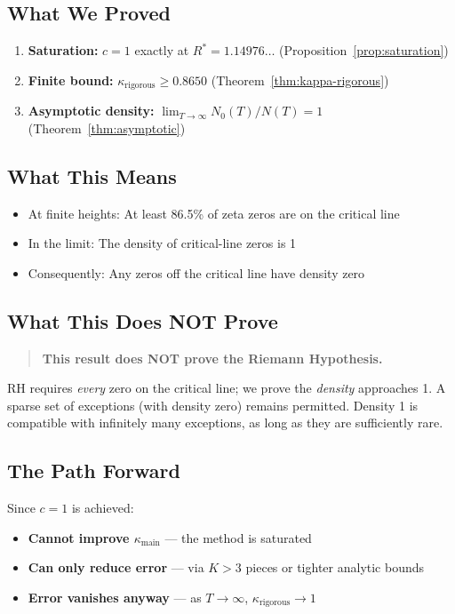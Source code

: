 \documentclass[11pt]{article}
\begin{document}
\subsection{What We Proved}

\begin{enumerate}
\item \textbf{Saturation:} $c = 1$ exactly at $R^* = 1.14976\ldots$ (Proposition~\ref{prop:saturation})
\item \textbf{Finite bound:} $\kappa_{\text{rigorous}} \geq 0.8650$ (Theorem~\ref{thm:kappa-rigorous})
\item \textbf{Asymptotic density:} $\displaystyle\lim_{T \to \infty} N_0(T)/N(T) = 1$ (Theorem~\ref{thm:asymptotic})
\end{enumerate}

\subsection{What This Means}

\begin{itemize}
\item At finite heights: At least 86.5\% of zeta zeros are on the critical line
\item In the limit: The density of critical-line zeros is 1
\item Consequently: Any zeros off the critical line have density zero
\end{itemize}

\subsection{What This Does NOT Prove}

\begin{quote}
\textbf{This result does NOT prove the Riemann Hypothesis.}
\end{quote}

RH requires \emph{every} zero on the critical line; we prove the \emph{density} approaches 1.
A sparse set of exceptions (with density zero) remains permitted. Density 1 is compatible with
infinitely many exceptions, as long as they are sufficiently rare.

\subsection{The Path Forward}

Since $c = 1$ is achieved:
\begin{itemize}
\item \textbf{Cannot improve $\kappa_{\text{main}}$} --- the method is saturated
\item \textbf{Can only reduce error} --- via $K > 3$ pieces or tighter analytic bounds
\item \textbf{Error vanishes anyway} --- as $T \to \infty$, $\kappa_{\text{rigorous}} \to 1$
\end{itemize}
\end{document}
